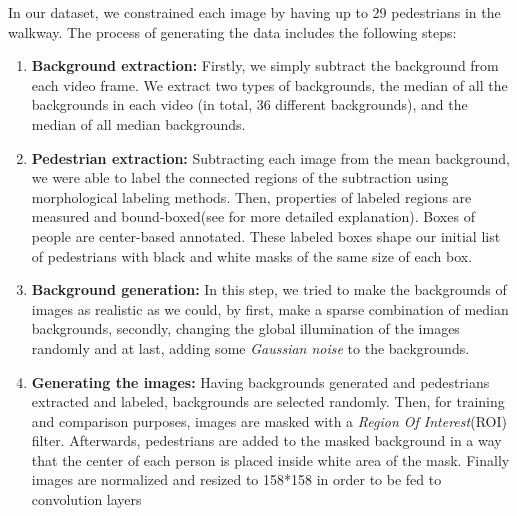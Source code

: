 In our dataset, we constrained each image by having up to 29 pedestrians in the walkway. The process of generating the data includes the following steps:
\begin{enumerate}

\item \textbf{Background extraction:} Firstly, we simply subtract the background from each video frame. We extract two types of backgrounds, the median of all the backgrounds in each video (in total, 36 different backgrounds), and the median of all median backgrounds.

\item \textbf{Pedestrian extraction:} Subtracting each image from the mean background, we were able to label the connected regions of the subtraction using morphological labeling methods. Then, properties of labeled regions are measured and bound-boxed(see \cite{van2014scikit} for more detailed explanation). Boxes of people are center-based annotated. These labeled boxes shape our initial list of pedestrians with black and white masks of the same size of each box.

\item \textbf{Background generation:} In this step, we tried to make the backgrounds of images as realistic as we could, by first, make a sparse combination of median backgrounds, secondly, changing the global illumination of the images randomly and at last, adding some \textit{Gaussian noise} to the backgrounds. 

\item \textbf{Generating the images:} Having backgrounds generated and pedestrians extracted and labeled, backgrounds are selected randomly. Then, for training and comparison purposes, images are masked with a \textit{Region Of Interest}(ROI) filter. Afterwards, pedestrians are added to the masked background in a way that the center of each person is placed inside white area of the mask. Finally images are normalized and resized to 158*158 in order to be fed to convolution layers

\end{enumerate}

